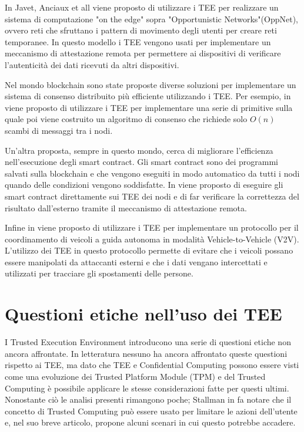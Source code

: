 \documentclass[12pt,italian]{report}
\begin{document}
\bigbreak \noindent

In Javet, Anciaux et all\cite{teeuses_edgeletcomputing} viene proposto di
utilizzare i TEE per realizzare un sistema di computazione "on the edge" sopra
"Opportunistic Networks"(OppNet), ovvero reti che sfruttano i
pattern di movimento degli utenti per creare reti temporanee.
In questo modello i TEE vengono usati per implementare un meccanismo di
attestazione remota per permettere ai dispositivi di verificare l'autenticità
dei dati ricevuti da altri dispositivi.

\bigbreak \noindent

Nel mondo blockchain sono state proposte diverse soluzioni per implementare
un sistema di consenso distribuito più efficiente utilizzando i TEE.
Per esempio, in \cite{teeuses_blockchainconsent} viene proposto di utilizzare
i TEE per implementare una serie di primitive sulla quale poi viene
costruito un algoritmo di consenso che richiede solo $O(n)$ scambi di messaggi
tra i nodi.

Un'altra proposta, sempre in questo mondo, cerca di migliorare l'efficienza
nell'esecuzione degli smart contract.
Gli smart contract sono dei programmi salvati sulla blockchain e che vengono
eseguiti in modo automatico da tutti i nodi quando delle condizioni vengono
soddisfatte.
In \cite{teeuses_smartcontract} viene proposto di eseguire gli smart contract
direttamente sui TEE dei nodi e di far verificare la correttezza del risultato
dall'esterno tramite il meccanismo di attestazione remota.

\bigbreak \noindent

Infine in \cite{teeuses_vehicles} viene proposto di utilizzare i TEE per
implementare un protocollo per il coordinamento di veicoli a guida
autonoma in modalità Vehicle-to-Vehicle (V2V).
L'utilizzo dei TEE in questo protocollo permette di evitare che i veicoli
possano essere manipolati da attaccanti esterni e che i dati vengano
intercettati e utilizzati per tracciare gli spostamenti delle persone. 

\section{Questioni etiche nell'uso dei TEE}
\label{sec:etica-tee}
I Trusted Execution Environment introducono una serie di questioni etiche
non ancora affrontate.
In letteratura nessuno ha ancora affrontato queste questioni rispetto ai TEE,
ma dato che TEE e Confidential Computing possono essere visti come una
evoluzione dei Trusted Platform Module (TPM) e del Trusted Computing 
è possibile applicare le stesse considerazioni fatte per questi ultimi.
Nonostante ciò le analisi presenti rimangono poche; Stallman in
\cite{stallman2021tpm} fa notare che il concetto di Trusted Computing può
essere usato per limitare le azioni dell'utente e, nel suo breve articolo,
propone alcuni scenari in cui questo potrebbe accadere. 
\end{document}
